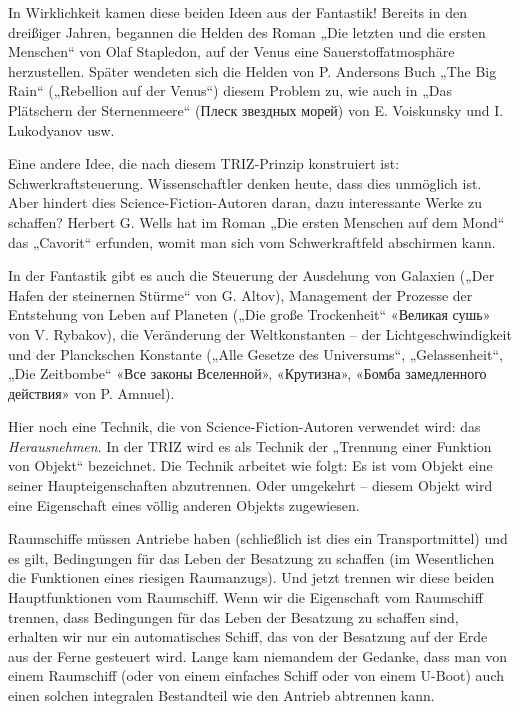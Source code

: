 \documentclass[11pt,a4paper]{article}
\begin{document}
In Wirklichkeit kamen diese beiden Ideen aus der Fantastik! Bereits in den
dreißiger Jahren, begannen die Helden des Roman „Die letzten und die ersten
Menschen“ von Olaf Stapledon, auf der Venus eine Sauerstoffatmosphäre
herzustellen. Später wendeten sich die Helden von P. Andersons Buch „The Big
Rain“ („Rebellion auf der Venus“) diesem Problem zu, wie auch in „Das
Plätschern der Sternenmeere“ (\foreignlanguage{russian}{Плеск звездных морей})
von E. Voiskunsky und I. Lukodyanov usw.

Eine andere Idee, die nach diesem TRIZ-Prinzip konstruiert ist:
Schwerkraftsteuerung. Wissenschaftler denken heute, dass dies unmöglich ist.
Aber hindert dies Science-Fiction-Autoren daran, dazu interessante Werke zu
schaffen? Herbert G. Wells hat im Roman „Die ersten Menschen auf dem Mond“ das
„Cavorit“ erfunden, womit man sich vom Schwerkraftfeld abschirmen kann.

In der Fantastik gibt es auch die Steuerung der Ausdehung von Galaxien („Der
Hafen der steinernen Stürme“ von G. Altov), Management der Prozesse der
Entstehung von Leben auf Planeten („Die große Trockenheit“
\foreignlanguage{russian}{«Великая сушь»} von V.  Rybakov), die Veränderung
der Weltkonstanten -- der Lichtgeschwindigkeit und der Planckschen Konstante
(„Alle Gesetze des Universums“, „Gelassenheit“, „Die Zeitbombe“
\foreignlanguage{russian}{«Все законы Вселенной», «Крутизна», «Бомба
  замедленного действия»} von P. Amnuel).

Hier noch eine Technik, die von Science-Fiction-Autoren verwendet wird: das
\emph{Herausnehmen}. In der TRIZ wird es als Technik der „Trennung einer
Funktion von Objekt“ bezeichnet.  Die Technik arbeitet wie folgt: Es ist vom
Objekt eine seiner Haupteigenschaften abzutrennen. Oder umgekehrt -- diesem
Objekt wird eine Eigenschaft eines völlig anderen Objekts zugewiesen.

Raumschiffe müssen Antriebe haben (schließlich ist dies ein Transportmittel)
und es gilt, Bedingungen für das Leben der Besatzung zu schaffen (im
Wesentlichen die Funktionen eines riesigen Raumanzugs). Und jetzt trennen wir
diese beiden Hauptfunktionen vom Raumschiff.  Wenn wir die Eigenschaft vom
Raumschiff trennen, dass Bedingungen für das Leben der Besatzung zu schaffen
sind, erhalten wir nur ein automatisches Schiff, das von der Besatzung auf der
Erde aus der Ferne gesteuert wird. Lange kam niemandem der Gedanke, dass man
von einem Raumschiff (oder von einem einfaches Schiff oder von einem U-Boot)
auch einen solchen integralen Bestandteil wie den Antrieb abtrennen kann.
\end{document}
